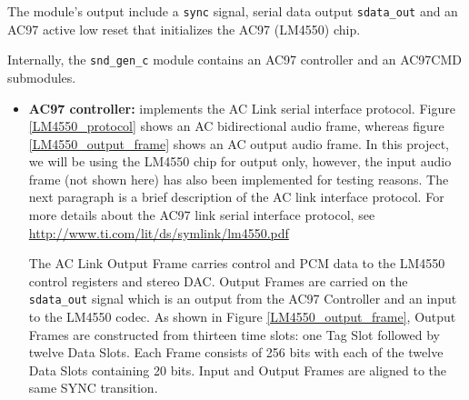 				The module's output include a \texttt{sync} signal, serial data output \texttt{sdata\_out} and an AC97 active low reset that initializes the AC97 (LM4550) chip. 
				
				Internally, the \texttt{snd\_gen\_c} module contains an AC97 controller and an AC97CMD submodules.
				\begin{itemize}
				\item \textbf{AC97 controller:} implements the AC Link serial interface protocol. Figure \ref{LM4550_protocol} shows an AC bidirectional audio frame, whereas figure \ref{LM4550_output_frame} shows an AC output audio frame. In this project, we will be using the LM4550 chip for output only, however, the input audio frame (not shown here) has also been implemented for testing reasons. The next paragraph is a brief description of the AC link interface protocol. For more details about the AC97 link serial interface protocol, see \url{http://www.ti.com/lit/ds/symlink/lm4550.pdf}
				
				The AC Link Output Frame carries control and PCM data to the LM4550 control registers and stereo DAC. Output Frames are carried on the \texttt{sdata\_out} signal which is an output from the AC97 Controller and an input to the LM4550 codec. As shown in Figure \ref{LM4550_output_frame}, Output Frames are constructed from thirteen time slots: one Tag Slot followed by twelve Data Slots. Each Frame consists of 256 bits with each of the twelve Data Slots containing 20 bits. Input and Output Frames are aligned to the same SYNC transition.
					

\end{itemize}
